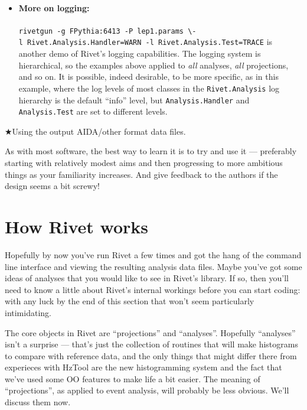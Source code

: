 \documentclass{JHEP3}
\DeclareRobustCommand{\TODO}[1]{\ensuremath{\bigstar}{#1}\xspace}
\newcommand{\kbd}[1]{\texttt{#1}\xspace}
\newcommand{\cmdbreak}{\textbackslash\newline}
\begin{document}
\begin{itemize}
\item \paragraph{More on logging:}{\kbd{rivetgun -g~FPythia:6413 -P~lep1.params
      \cmdbreak -l~Rivet.Analysis.Handler=WARN -l~Rivet.Analysis.Test=TRACE}
    is another demo of Rivet's logging capabilities. The logging system is
    hierarchical, so the examples above applied to \emph{all} analyses,
    \emph{all} projections, and so on. It is possible, indeed desirable, to be
    more specific, as in this example, where the log levels of most classes in
    the \kbd{Rivet.Analysis} log hierarchy is the default ``info'' level, but
    \kbd{Analysis.Handler} and \kbd{Analysis.Test} are set to different levels.}
\end{itemize}

\TODO{Using the output AIDA/other format data files.}

As with most software, the best way to learn it is to try and use it ---
preferably starting with relatively modest aims and then progressing to more
ambitious things as your familiarity increases. And give feedback to the authors
if the design seems a bit screwy!



\section{How Rivet works}
Hopefully by now you've run Rivet a few times and got the hang of the command
line interface and viewing the resulting analysis data files. Maybe you've got
some ideas of analyses that you would like to see in Rivet's library. If so,
then you'll need to know a little about Rivet's internal workings before you can
start coding: with any luck by the end of this section that won't seem
particularly intimidating.

The core objects in Rivet are ``projections'' and ``analyses''. Hopefully
``analyses'' isn't a surprise --- that's just the collection of routines that
will make histograms to compare with reference data, and the only things that
might differ there from experieces with HzTool are the new histogramming system
and the fact that we've used some OO features to make life a bit easier. The
meaning of ``projections'', as applied to event analysis, will probably be less
obvious. We'll discuss them now.
\end{document}
